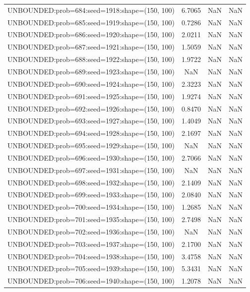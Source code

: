\begin{longtable}{lccc}
UNBOUNDED:prob=684:seed=1918:shape=(150, 100) &  6.7065 &   NaN &    NaN \\
UNBOUNDED:prob=685:seed=1919:shape=(150, 100) &  0.7286 &   NaN &    NaN \\
UNBOUNDED:prob=686:seed=1920:shape=(150, 100) &  2.0211 &   NaN &    NaN \\
UNBOUNDED:prob=687:seed=1921:shape=(150, 100) &  1.5059 &   NaN &    NaN \\
UNBOUNDED:prob=688:seed=1922:shape=(150, 100) &  1.9722 &   NaN &    NaN \\
UNBOUNDED:prob=689:seed=1923:shape=(150, 100) &     NaN &   NaN &    NaN \\
UNBOUNDED:prob=690:seed=1924:shape=(150, 100) &  2.3223 &   NaN &    NaN \\
UNBOUNDED:prob=691:seed=1925:shape=(150, 100) &  1.9274 &   NaN &    NaN \\
UNBOUNDED:prob=692:seed=1926:shape=(150, 100) &  0.8470 &   NaN &    NaN \\
UNBOUNDED:prob=693:seed=1927:shape=(150, 100) &  1.4049 &   NaN &    NaN \\
UNBOUNDED:prob=694:seed=1928:shape=(150, 100) &  2.1697 &   NaN &    NaN \\
UNBOUNDED:prob=695:seed=1929:shape=(150, 100) &     NaN &   NaN &    NaN \\
UNBOUNDED:prob=696:seed=1930:shape=(150, 100) &  2.7066 &   NaN &    NaN \\
UNBOUNDED:prob=697:seed=1931:shape=(150, 100) &     NaN &   NaN &    NaN \\
UNBOUNDED:prob=698:seed=1932:shape=(150, 100) &  2.1409 &   NaN &    NaN \\
UNBOUNDED:prob=699:seed=1933:shape=(150, 100) &  2.0840 &   NaN &    NaN \\
UNBOUNDED:prob=700:seed=1934:shape=(150, 100) &  1.2685 &   NaN &    NaN \\
UNBOUNDED:prob=701:seed=1935:shape=(150, 100) &  2.7498 &   NaN &    NaN \\
UNBOUNDED:prob=702:seed=1936:shape=(150, 100) &     NaN &   NaN &    NaN \\
UNBOUNDED:prob=703:seed=1937:shape=(150, 100) &  2.1700 &   NaN &    NaN \\
UNBOUNDED:prob=704:seed=1938:shape=(150, 100) &  3.4758 &   NaN &    NaN \\
UNBOUNDED:prob=705:seed=1939:shape=(150, 100) &  5.3431 &   NaN &    NaN \\
UNBOUNDED:prob=706:seed=1940:shape=(150, 100) &  1.2078 &   NaN &    NaN \\

\end{longtable}
